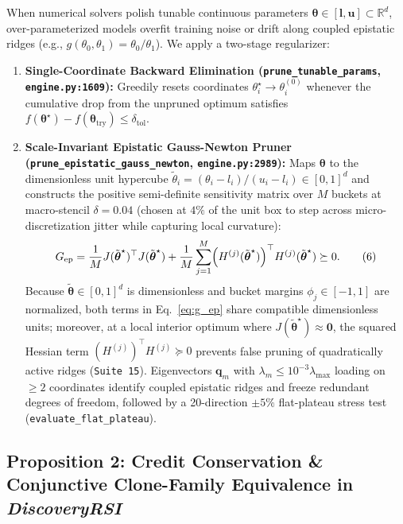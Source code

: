 \documentclass[11pt,a4paper]{article}
\begin{document}
When numerical solvers polish tunable continuous parameters $\boldsymbol{\theta} \in [\mathbf{l}, \mathbf{u}] \subset \mathbb{R}^d$, over-parameterized models overfit training noise or drift along coupled epistatic ridges (e.g., $g(\theta_0, \theta_1) = \theta_0 / \theta_1$). We apply a two-stage regularizer:
\begin{enumerate}
\item \textbf{Single-Coordinate Backward Elimination (\texttt{prune\_tunable\_params}, \texttt{engine.py:1609}):} Greedily resets coordinates $\theta_i^\star \to \theta_i^{(0)}$ whenever the cumulative drop from the unpruned optimum satisfies $f(\boldsymbol{\theta}^\star) - f(\boldsymbol{\theta}_{\text{try}}) \le \delta_{\text{tol}}$.
\item \textbf{Scale-Invariant Epistatic Gauss-Newton Pruner (\texttt{prune\_epistatic\_gauss\_newton}, \texttt{engine.py:2989}):} Maps $\boldsymbol{\theta}$ to the dimensionless unit hypercube $\tilde{\theta}_i = (\theta_i - l_i)/(u_i - l_i) \in [0, 1]^d$ and constructs the positive semi-definite sensitivity matrix over $M$ buckets at macro-stencil $\delta = 0.04$ (chosen at $4\%$ of the unit box to step across micro-discretization jitter while capturing local curvature):
\begin{equation}
G_{\text{ep}} = \frac{1}{M} J(\tilde{\boldsymbol{\theta}}^\star)^\top J(\tilde{\boldsymbol{\theta}}^\star) + \frac{1}{M}\sum_{j=1}^M \Bigl(H^{(j)}(\tilde{\boldsymbol{\theta}}^\star)\Bigr)^\top H^{(j)}(\tilde{\boldsymbol{\theta}}^\star) \succeq 0.
\tag{6}\label{eq:g_ep}
\end{equation}
Because $\tilde{\boldsymbol{\theta}} \in [0, 1]^d$ is dimensionless and bucket margins $\phi_j \in [-1, 1]$ are normalized, both terms in Eq.~\eqref{eq:g_ep} share compatible dimensionless units; moreover, at a local interior optimum where $J(\tilde{\boldsymbol{\theta}}^\star) \approx \mathbf{0}$, the squared Hessian term $(H^{(j)})^\top H^{(j)} \succeq 0$ prevents false pruning of quadratically active ridges (\texttt{Suite 15}). Eigenvectors $\mathbf{q}_m$ with $\lambda_m \le 10^{-3}\lambda_{\max}$ loading on $\ge 2$ coordinates identify coupled epistatic ridges and freeze redundant degrees of freedom, followed by a 20-direction $\pm 5\%$ flat-plateau stress test (\texttt{evaluate\_flat\_plateau}).
\end{enumerate}

\subsection{Proposition 2: Credit Conservation \& Conjunctive Clone-Family Equivalence in \emph{DiscoveryRSI}}
\end{document}
